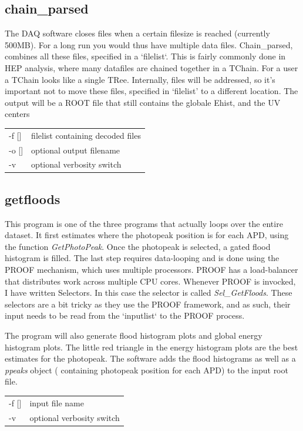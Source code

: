 \documentclass[12pt]{article}
\begin{document}
\subsection{chain\_parsed}
The DAQ software closes files when a certain filesize is reached (currently 500MB). For a long run you would thus have multiple data files. Chain\_parsed, combines all these files, specified in a `filelist`. This is fairly commonly done in HEP analysis, where many datafiles are chained together in a TChain. For a user a TChain looks like a single TRee. Internally, files will be addressed, so it's important not to move these files, specified in `filelist' to a different location. The output will be a ROOT file that still contains the globale Ehist, and the UV centers\\
\begin{tabular}{ll}
-f []& filelist containing decoded files\\
-o []& optional output filename\\
-v & optional verbosity switch\\
\end{tabular}


\subsection{getfloods}
This program is one of the three programs that actually loops over the entire dataset. It first estimates where the photopeak position is for each APD, using the function {\em GetPhotoPeak}. Once the photopeak is selected, a gated flood histogram is filled. The last step requires data-looping and is done using the PROOF mechanism, which uses multiple processors. PROOF has a load-balancer that distributes work across multiple CPU cores. Whenever PROOF is invocked, I have written Selectors. In this case the selector is called {\em Sel\_GetFloods}. These selectors are a bit tricky as they use the PROOF framework, and as such, their input needs to be read from the `inputlist` to the PROOF process. 

The program will also generate flood histogram plots and global energy histogram plots. The little red triangle in the energy histogram plots are the best estimates for the photopeak. The software adds the flood histograms as well as a {\em ppeaks} object ( containing photopeak position for each APD) to the input root file. \\
\begin{tabular}{ll}
-f []& input file name\\
-v & optional verbosity switch\\
\end{tabular}
\end{document}
